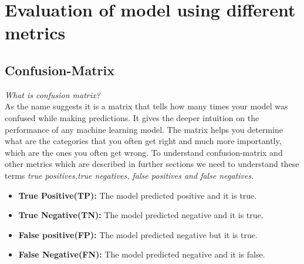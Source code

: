 \section{Evaluation of model using different metrics}
\subsection{Confusion-Matrix}
\textit{What is confusion matrix?}\\
As the name suggests it is a matrix that tells how many times your model was confused while making predictions. It gives the deeper intuition on the performance of any machine learning model. The matrix helps you determine what are the categories that you often get right and much more importantly, which are the ones you often get wrong. To understand confusion-matrix and other metrics which are described in further sections we need to understand these terms \textit{true positives,true negatives, false positives and false negatives.} \cite{inproceedings}
\begin{itemize}
    \item \textbf{True Positive(TP):} The model predicted positive and it is true.
    \item \textbf{True Negative(TN):} The model predicted negative and it is true.
    \item \textbf{False positive(FP):} The model predicted negative but it is true.
    \item \textbf{False Negative(FN):} The model predicted negative and it is false.
    \end{itemize}


